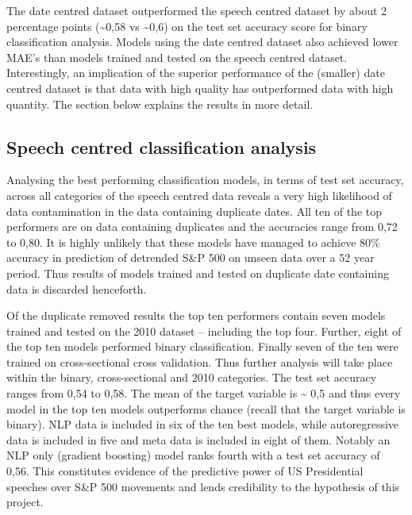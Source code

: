 \documentclass[11pt,preprint, authoryear]{elsarticle}
\numberwithin{equation}{section}
\numberwithin{figure}{section}
\numberwithin{table}{section}
\begin{document}
The date centred dataset outperformed the speech centred dataset by
about 2 percentage points (\textasciitilde0,58 vs \textasciitilde0,6) on
the test set accuracy score for binary classification analysis. Models
using the date centred dataset also achieved lower MAE's than models
trained and tested on the speech centred dataset. Interestingly, an
implication of the superior performance of the (smaller) date centred
dataset is that data with high quality has outperformed data with high
quantity. The section below explains the results in more detail.

\hypertarget{speech-centred-classification-analysis}{%
\subsection{Speech centred classification
analysis}\label{speech-centred-classification-analysis}}

Analysing the best performing classification models, in terms of test
set accuracy, across all categories of the speech centred data reveals a
very high likelihood of data contamination in the data containing
duplicate dates. All ten of the top performers are on data containing
duplicates and the accuracies range from 0,72 to 0,80. It is highly
unlikely that these models have managed to achieve 80\% accuracy in
prediction of detrended S\&P 500 on unseen data over a 52 year period.
Thus results of models trained and tested on duplicate date containing
data is discarded henceforth.

Of the duplicate removed results the top ten performers contain seven
models trained and tested on the 2010 dataset -- including the top four.
Further, eight of the top ten models performed binary classification.
Finally seven of the ten were trained on cross-sectional cross
validation. Thus further analysis will take place within the binary,
cross-sectional and 2010 categories. The test set accuracy ranges from
0,54 to 0,58. The mean of the target variable is \textasciitilde{} 0,5
and thus every model in the top ten models outperforms chance (recall
that the target variable is binary). NLP data is included in six of the
ten best models, while autoregressive data is included in five and meta
data is included in eight of them. Notably an NLP only (gradient
boosting) model ranks fourth with a test set accuracy of 0,56. This
constitutes evidence of the predictive power of US Presidential speeches
over S\&P 500 movements and lends credibility to the hypothesis of this
project.
\end{document}
